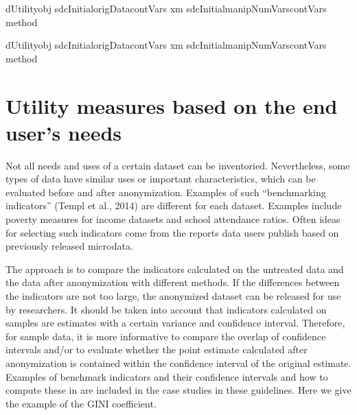 \documentclass[letterpaper,10pt,english]{sphinxmanual}
\begin{document}
\def\sphinxLiteralBlockLabel{\label{\detokenize{utility:code68}}}
%
\begin{sphinxVerbatim}[commandchars=\\\{\},numbers=left,firstnumber=1,stepnumber=1]
dUtilityobj  sdcInitialorigData\PYG{p}{[}contVars\PYG{p}{]} xm 
sdcInitialmanipNumVars\PYG{p}{[}contVars\PYG{p}{]} method  

dUtilityobj  sdcInitialorigData\PYG{p}{[}contVars\PYG{p}{]} xm 
sdcInitialmanipNumVars\PYG{p}{[}contVars\PYG{p}{]} method  
\end{sphinxVerbatim}


\section{Utility measures based on the end user’s needs}
\label{\detokenize{utility:utility-measures-based-on-the-end-users-needs}}
Not all needs and uses of a certain dataset can be inventoried.
Nevertheless, some types of data have similar uses or important
characteristics, which can be evaluated before and after anonymization.
Examples of such “benchmarking indicators” (Templ et al., 2014) are
different for each dataset. Examples include poverty measures for income
datasets and school attendance ratios. Often ideas for selecting such
indicators come from the reports data users publish based on previously
released microdata.

The approach is to compare the indicators calculated on the untreated
data and the data after anonymization with different methods. If the
differences between the indicators are not too large, the anonymized
dataset can be released for use by researchers. It should be taken into
account that indicators calculated on samples are estimates with a
certain variance and confidence interval. Therefore, for sample data, it
is more informative to compare the overlap of confidence intervals
and/or to evaluate whether the point estimate calculated after
anonymization is contained within the confidence interval of the
original estimate. Examples of benchmark indicators and their confidence
intervals and how to compute these in  are included in the case
studies in these guidelines. Here we give the example of the GINI
coefficient.
\end{document}

